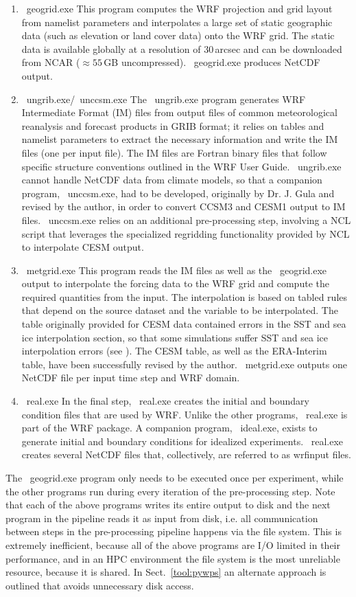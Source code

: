 \documentclass[letterpaper,12pt,headsepline,final]{scrartcl} %
\newcommand{\sect}[1]{Sect.~\ref{#1}}
\newcommand{\geogrid}{\mbox{\color{orange} \ttfamily geogrid.exe}}
\newcommand{\ungrib}{\mbox{\color{purple} \ttfamily ungrib.exe}}
\newcommand{\unccsm}{\mbox{\color{red} \ttfamily unccsm.exe}}
\newcommand{\metgrid}{\mbox{\color{cyan} \ttfamily metgrid.exe}}
\newcommand{\real}{\mbox{\color{violet} \ttfamily real.exe}}
\newcommand{\ideal}{\mbox{\color{magenta} \ttfamily ideal.exe}}
\begin{document}
\begin{enumerate}
  \item \geogrid{} This program computes the WRF projection and grid layout from namelist parameters and interpolates a large set of static geographic data (such as elevation or land cover data) onto the WRF grid. The static data is available globally at a resolution of 30\,arcsec and can be downloaded from NCAR ($\approx 55$\,GB uncompressed). \geogrid{} produces NetCDF output.
  \item \ungrib{}/\unccsm{} The \ungrib{} program generates WRF Intermediate Format (IM) files from output files of common meteorological reanalysis and forecast products in GRIB format; it relies on tables and namelist parameters to extract the necessary information and write the IM files (one per input file). The IM files are Fortran binary files that follow specific structure conventions outlined in the WRF User Guide.
  \ungrib{} cannot handle NetCDF data from climate models, so that a companion program, \unccsm{}, had to be developed, originally by Dr. J. Gula and revised by the author, in order to convert CCSM3 and CESM1 output to IM files. \unccsm{} relies on an additional pre-processing step, involving a NCL script that leverages the specialized regridding functionality provided by NCL to interpolate CESM output.
  \item \metgrid{} This program reads the IM files as well as the \geogrid{} output to interpolate the forcing data to the WRF grid and compute the required quantities from the input. The interpolation is based on tabled rules that depend on the source dataset and the variable to be interpolated. The table originally provided for CESM data contained errors in the SST and sea ice interpolation section, so that some simulations suffer SST and sea ice interpolation errors (see \citealp[][\S2.1.2]{erler2015phd}). The CESM table, as well as the ERA-Interim table, have been successfully revised by the author. \metgrid{} outputs one NetCDF file per input time step and WRF domain.
  \item \real{} In the final step, \real{} creates the initial and boundary condition files that are used by WRF. Unlike the other programs, \real{} is part of the WRF package. A companion program, \ideal{}, exists to generate initial and boundary conditions for idealized experiments. \real{} creates several NetCDF files that, collectively, are referred to as \textsf{wrfinput} files.
\end{enumerate}
The \geogrid{} program only needs to be executed once per experiment, while the other programs run during every iteration of the pre-processing step.
Note that each of the above programs writes its entire output to disk and the next program in the pipeline reads it as input from disk, i.e. all communication between steps in the pre-processing pipeline happens via the file system. This is extremely inefficient, because all of the above programs are I/O limited in their performance, and in an HPC environment the file system is the most unreliable resource, because it is shared. In \sect{tool:pywps} an alternate approach is outlined that avoids unnecessary disk access.
\end{document}
